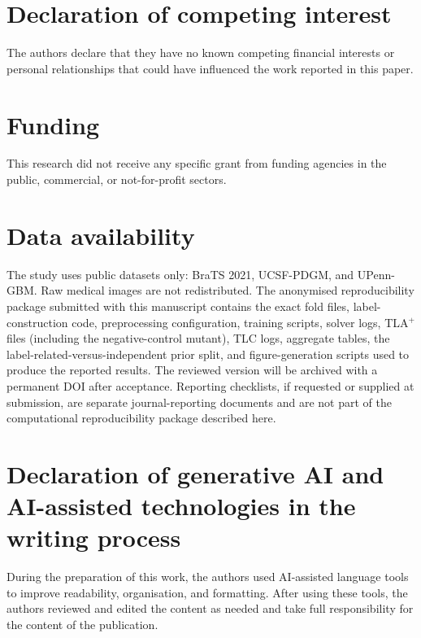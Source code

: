\documentclass[preprint,11pt]{elsarticle}
\begin{document}
\section*{Declaration of competing interest}
The authors declare that they have no known competing financial interests or personal relationships that could have influenced the work reported in this paper.

\section*{Funding}
This research did not receive any specific grant from funding agencies in the public, commercial, or not-for-profit sectors.

\section*{Data availability}
The study uses public datasets only: BraTS 2021, UCSF-PDGM, and UPenn-GBM. Raw medical images are not redistributed. The anonymised reproducibility package submitted with this manuscript contains the exact fold files, label-construction code, preprocessing configuration, training scripts, solver logs, TLA$^{+}$ files (including the negative-control mutant), TLC logs, aggregate tables, the label-related-versus-independent prior split, and figure-generation scripts used to produce the reported results. The reviewed version will be archived with a permanent DOI after acceptance. Reporting checklists, if requested or supplied at submission, are separate journal-reporting documents and are not part of the computational reproducibility package described here.

\section*{Declaration of generative AI and AI-assisted technologies in the writing process}
During the preparation of this work, the authors used AI-assisted language tools to improve readability, organisation, and formatting. After using these tools, the authors reviewed and edited the content as needed and take full responsibility for the content of the publication.

\appendix
\end{document}
